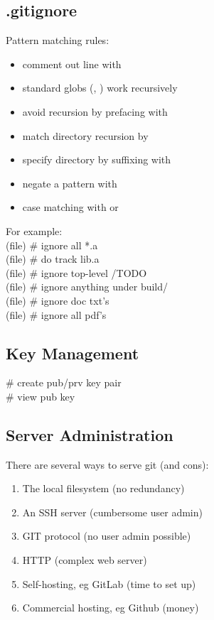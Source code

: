 \subsection*{.gitignore}
Pattern matching rules:
\begin{itemize}
    \item comment out line with \code{\#}
    \item standard globs  (\code{*}, ) work recursively
    \item avoid recursion by prefacing with \code{\textbackslash}
    \item match directory recursion by \code{**}
    \item specify directory by suffixing with \code{\textbackslash}
    \item negate a pattern with \code{!}
    \item case matching with \code{[abc]} or \code{[a-c]}
\end{itemize}
For example: \\
(file)  \# ignore all *.a \\
(file)  \# do track lib.a \\
(file)  \# ignore top-level /TODO\\
(file)  \# ignore anything under build/ \\
(file)  \# ignore doc txt's \\
(file)  \# ignore all pdf's \\


\subsection*{Key Management}
 \# create pub/prv key pair\\
 \# view pub key\\


\subsection*{Server Administration}
There are several ways to serve git (and cons):
\begin{enumerate}
    \item The local filesystem (no redundancy)
    \item An SSH server (cumbersome user admin)
    \item GIT protocol (no user admin possible)
    \item {} HTTP (complex web server)
    \item Self-hosting, eg GitLab (time to set up)
    \item Commercial hosting, eg Github (money)
\end{enumerate}

